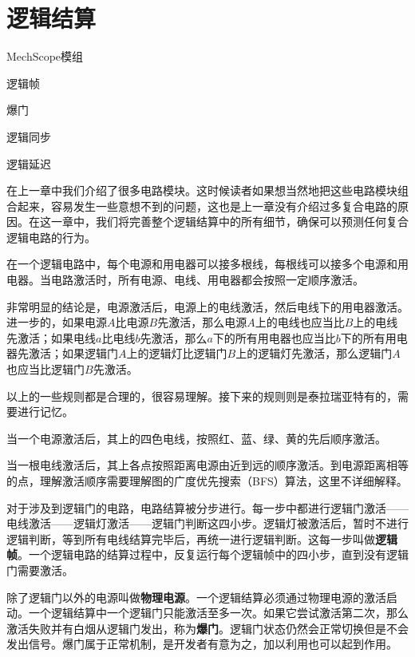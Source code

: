 \chapter{逻辑结算}\label{sec7}

\begin{introduction}
\item MechScope模组
\item 逻辑帧
\item 爆门
\item 逻辑同步
\item 逻辑延迟
\end{introduction}

\begin{example}
\end{example}

在上一章中我们介绍了很多电路模块。这时候读者如果想当然地把这些电路模块组合起来，容易发生一些意想不到的问题，这也是上一章没有介绍过多复合电路的原因。在这一章中，我们将完善整个逻辑结算中的所有细节，确保可以预测任何复合逻辑电路的行为。

在一个逻辑电路中，每个电源和用电器可以接多根线，每根线可以接多个电源和用电器。当电路激活时，所有电源、电线、用电器都会按照一定顺序激活。

非常明显的结论是，电源激活后，电源上的电线激活，然后电线下的用电器激活。进一步的，如果电源$A$比电源$B$先激活，那么电源$A$上的电线也应当比$B$上的电线先激活；如果电线$a$比电线$b$先激活，那么$a$下的所有用电器也应当比$b$下的所有用电器先激活；如果逻辑门$A$上的逻辑灯比逻辑门$B$上的逻辑灯先激活，那么逻辑门$A$也应当比逻辑门$B$先激活。

以上的一些规则都是合理的，很容易理解。接下来的规则则是泰拉瑞亚特有的，需要进行记忆。

当一个电源激活后，其上的四色电线，按照红、蓝、绿、黄的先后顺序激活。

当一根电线激活后，其上各点按照距离电源由近到远的顺序激活。到电源距离相等的点，理解激活顺序需要理解图的广度优先搜索（BFS）算法，这里不详细解释。

对于涉及到逻辑门的电路，电路结算被分步进行。每一步中都进行逻辑门激活——电线激活——逻辑灯激活——逻辑门判断这四小步。逻辑灯被激活后，暂时不进行逻辑判断，等到所有电线结算完毕后，再统一进行逻辑判断。这每一步叫做\textbf{逻辑帧}。一个逻辑电路的结算过程中，反复运行每个逻辑帧中的四小步，直到没有逻辑门需要激活。

除了逻辑门以外的电源叫做\textbf{物理电源}。一个逻辑结算必须通过物理电源的激活启动。一个逻辑结算中一个逻辑门只能激活至多一次。如果它尝试激活第二次，那么激活失败并有白烟从逻辑门发出，称为\textbf{爆门}。逻辑门状态仍然会正常切换但是不会发出信号。爆门属于正常机制，是开发者有意为之，加以利用也可以起到作用。

